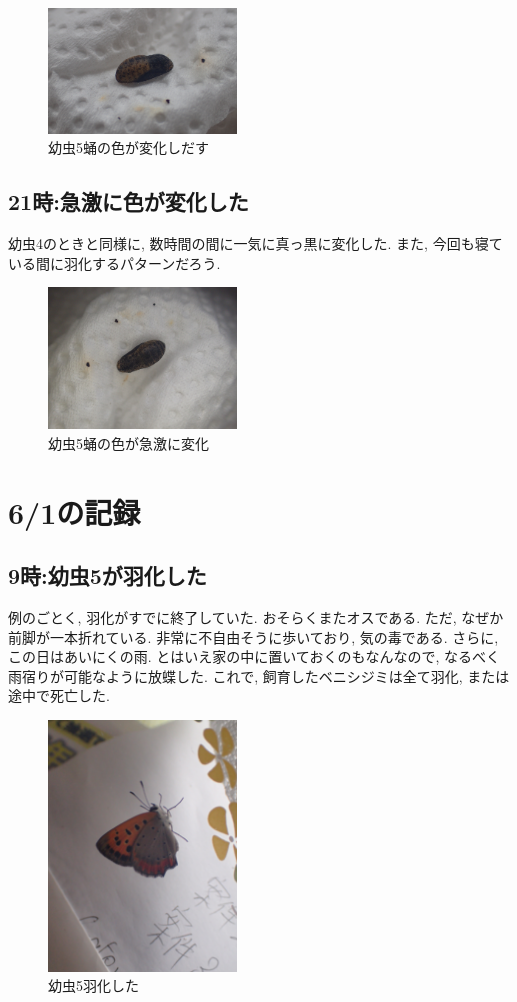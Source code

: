 \documentclass{jsarticle}
\begin{document}
\begin{figure}[htbp]
  \begin{center}
    \includegraphics[width=5cm]{photo14/Larva5-pupa.JPG}
  \end{center}
  \caption{幼虫5蛹の色が変化しだす}
\end{figure}

\subsection{21時:急激に色が変化した}
幼虫4のときと同様に, 数時間の間に一気に真っ黒に変化した. 
また, 今回も寝ている間に羽化するパターンだろう. 

\begin{figure}[htbp]
  \begin{center}
    \includegraphics[width=5cm]{photo14/Larva5-pupa2.JPG}
  \end{center}
  \caption{幼虫5蛹の色が急激に変化}
\end{figure}

\section{6/1の記録}
\subsection{9時:幼虫5が羽化した}
例のごとく, 羽化がすでに終了していた. 
おそらくまたオスである. 
ただ, なぜか前脚が一本折れている. 非常に不自由そうに歩いており, 気の毒である. 
さらに, この日はあいにくの雨. とはいえ家の中に置いておくのもなんなので, 
なるべく雨宿りが可能なように放蝶した. 
これで, 飼育したベニシジミは全て羽化, または途中で死亡した. 

\begin{figure}[htbp]
  \begin{center}
    \includegraphics[width=5cm]{photo15/Larva5-emergence.JPG}
  \end{center}
  \caption{幼虫5羽化した}
\end{figure}
\end{document}
